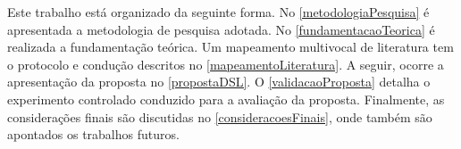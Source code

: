 Este trabalho está organizado da seguinte forma. 
No \autoref{metodologiaPesquisa} é apresentada a metodologia de pesquisa adotada. 
No \autoref{fundamentacaoTeorica} é realizada a fundamentação teórica. Um mapeamento multivocal de literatura tem o protocolo e condução descritos no \autoref{mapeamentoLiteratura}. 
A seguir, ocorre a apresentação da proposta no \autoref{propostaDSL}. 
O \autoref{validacaoProposta} detalha o experimento controlado conduzido para a avaliação da proposta.
Finalmente, as considerações finais são discutidas no \autoref{consideracoesFinais}, onde também são apontados os trabalhos futuros.